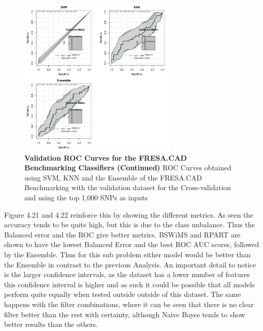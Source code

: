  \begin{figure}[!ht]
\centerline{\includegraphics[width=3in]{images/results/fresaCurves2Val.png}}
\caption{{\bf Validation ROC Curves for the FRESA.CAD Benchmarking Classifiers (Continued)} 
ROC Curves obtained using SVM, KNN and the Ensemble of the FRESA.CAD Benchmarking with the validation dataset for the Cross-validation and using the top 1,000 SNPs as inputs}
\label{fig25}
\end{figure}

Figure 4.21 and 4.22 reinforce this by showing the different metrics. As seen the accuracy tends to be quite high, but this is due to the class unbalance. Thus the Balanced error and the ROC give better metrics.  BSWiMS and RPART are shown to have the lowest Balanced Error and the best ROC AUC scores, followed by the Ensemble. Thus for this sub problem either model would be better than the Ensemble in contrast to the previous Analysis. An important detail to notice is the larger confidence intervals, as the dataset has a lower number of features this confidence interval is higher and as such it could be possible that all models perform quite equally when tested outside outside of this dataset. The same happens with the filter combinations, where it can be seen that there is no clear filter better than the rest with certainty, although Naive Bayes tends to show better results than the others.

